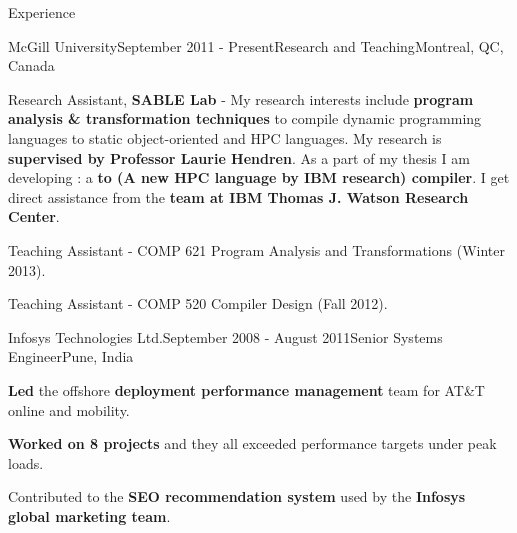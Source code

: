 \documentclass{resume} %
\begin{document}
\begin{rSection}{Experience}
\begin{rSubsection}{McGill University}{September 2011 - Present}{Research and Teaching}{Montreal, QC, Canada}
\item Research Assistant, \textbf{SABLE Lab} - My research interests include \textbf{program analysis \& transformation techniques} to compile dynamic 
programming languages to static object-oriented and HPC languages. My research is \textbf{supervised by Professor Laurie Hendren}. As a part of my thesis 
I am developing \mixten: a \textbf{\matlab to \xten (A new HPC language by IBM research) compiler}. I get direct assistance 
from the \textbf{\xten team at IBM Thomas J. Watson Research Center}.   
\item Teaching Assistant - COMP 621 Program Analysis and Transformations (Winter 2013). 
\item Teaching Assistant - COMP 520 Compiler Design (Fall 2012).
\end{rSubsection}

\begin{rSubsection}{Infosys Technologies Ltd.}{September 2008 - August 2011}{Senior Systems Engineer}{Pune, India}
\item \textbf{Led} the offshore \textbf{deployment performance management} team for AT\&T online and mobility.
\item \textbf{Worked on 8 projects} and they all exceeded performance targets under peak loads.
\item Contributed to the \textbf{SEO recommendation system} used by the \textbf{Infosys global marketing team}.
\end{rSubsection}


\end{rSection}
\end{document}
